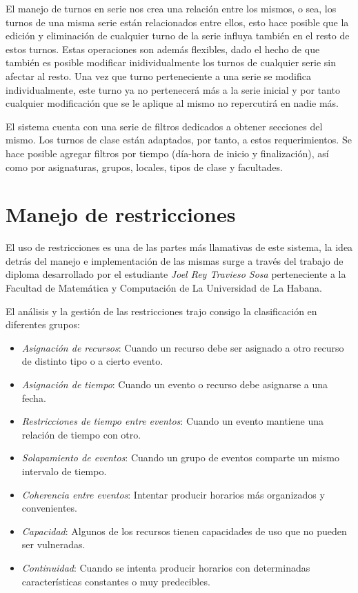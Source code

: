 El manejo de turnos en serie nos crea una relación entre los mismos, o sea, los turnos de una misma serie están relacionados entre ellos, esto hace posible que la edición y eliminación de cualquier turno de la serie influya también en el resto de estos turnos. Estas operaciones son además flexibles, dado el hecho de que también es posible modificar inidividualmente los turnos de cualquier serie sin afectar al resto. Una vez que turno perteneciente a una serie se modifica individualmente, este turno ya no pertenecerá más a la serie inicial y por tanto cualquier modificación que se le aplique al mismo no repercutirá en nadie más.

El sistema cuenta con una serie de filtros dedicados a obtener secciones del mismo. Los turnos de clase están adaptados, por tanto, a estos requerimientos. Se hace posible agregar filtros por tiempo (día-hora de inicio y finalización), así como por asignaturas, grupos, locales, tipos de clase y facultades.

\section{Manejo de restricciones}
\label{sec:restrictions}

El uso de restricciones es una de las partes más llamativas de este sistema, la idea detrás del manejo e implementación de las mismas surge a través del trabajo de diploma desarrollado por el estudiante \textit{Joel Rey Travieso Sosa} \cite{thesis_joel} perteneciente a la Facultad de Matemática y Computación de La Universidad de La Habana.

El análisis y la gestión de las restricciones trajo consigo la clasificación en diferentes grupos:
\begin{itemize}
	\item \textit{Asignación de recursos}: Cuando un recurso debe ser asignado a otro recurso de distinto tipo o a cierto evento.
	\item \textit{Asignación de tiempo}: Cuando un evento o recurso debe asignarse a una fecha.
	\item \textit{Restricciones de tiempo entre eventos}: Cuando un evento mantiene una relación de tiempo con otro.
	\item \textit{Solapamiento de eventos}: Cuando un grupo de eventos comparte un mismo intervalo de tiempo.
	\item \textit{Coherencia entre eventos}: Intentar producir horarios más organizados y convenientes.
	\item \textit{Capacidad}: Algunos de los recursos tienen capacidades de uso que no pueden ser vulneradas.
	\item \textit{Continuidad}: Cuando se intenta producir horarios con determinadas características constantes o muy predecibles.
	
\end{itemize}

